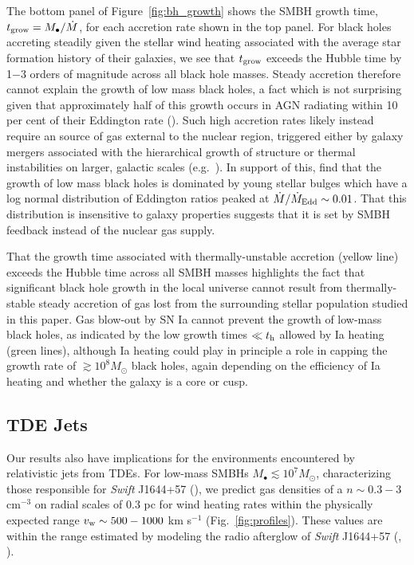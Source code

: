 \documentclass[usenatbib,fleqn]{mn2e}
\newcommand{\Mdot}{\dot{M}}
\newcommand{\MdotEdd}{\dot{M}_{\rm Edd}}
\begin{document}
The bottom panel of Figure~\ref{fig:bh_growth} shows the SMBH growth
time, $t_{\rm grow} = M_{\bullet}/\dot{M}$, for each accretion rate
shown in the top panel.  For black holes accreting steadily given the
stellar wind heating associated with the average star formation
history of their galaxies, we see that $t_{\rm grow}$ exceeds the
Hubble time by 1$-$3 orders of magnitude across all black hole masses.
Steady accretion therefore cannot explain the growth of low mass black
holes, a fact which is not surprising given that approximately half of
this growth occurs in AGN radiating within 10 per cent of their
Eddington rate (\citealt{Heckman+04}).  Such high accretion rates
likely instead require an source of gas external to the nuclear
region, triggered either by galaxy mergers associated with the
hierarchical growth of structure or thermal instabilities on larger,
galactic scales (e.g.~\citealt{Ciotti+10}).  In support of this,
\citet{Kauffmann&Heckman09} find that the growth of low mass black
holes is dominated by young stellar bulges which have a log normal
distribution of Eddington ratios peaked at $\Mdot/\MdotEdd\sim
0.01$. That this distribution is insensitive to galaxy properties
suggests that it is set by SMBH feedback instead of the nuclear gas
supply.

That the growth time associated with thermally-unstable accretion
(yellow line) exceeds the Hubble time across all SMBH masses
highlights the fact that significant black hole growth in the local
universe cannot result from thermally-stable steady accretion of gas
lost from the surrounding stellar population studied in this paper.
Gas blow-out by SN Ia cannot prevent the growth of low-mass black
holes, as indicated by the low growth times $\ll t_{\rm h}$ allowed by
Ia heating (green lines), although Ia heating could play in principle
a role in capping the growth rate of $\gtrsim 10^{8}M_{\odot}$ black
holes, again depending on the efficiency of Ia heating and whether the
galaxy is a core or cusp.


\subsection{TDE Jets}
\label{sec:TDE}

Our results also have implications for the environments encountered by
relativistic jets from TDEs.  For low-mass SMBHs $M_{\bullet} \lesssim
10^{7}M_{\odot}$, characterizing those responsible for {\it Swift}
J1644+57 (\citealt{Bloom+11}), we predict gas densities of a $n
\sim 0.3-3$ cm$^{-3}$ on radial scales of 0.3 pc for wind heating
rates within the physically expected range $v_{\rm w} \sim 500-1000$
km s$^{-1}$ (Fig.~\ref{fig:profiles}).  These values are within the
range estimated by modeling the radio afterglow of {\it Swift}
J1644+57 (\citealt{Metzger+12}, \citealt{BergerZauderer+:2012a}).  
\end{document}
